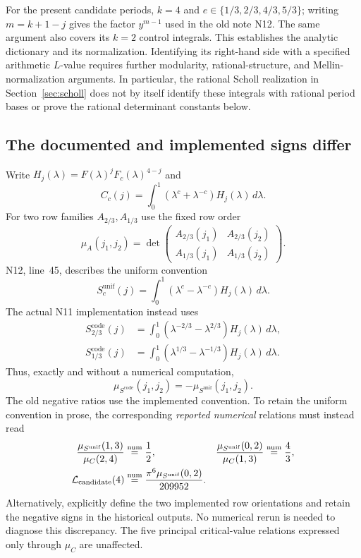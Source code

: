 For the present candidate periods, $k=4$ and
$e\in\{1/3,2/3,4/3,5/3\}$; writing $m=k+1-j$ gives the factor
$y^{m-1}$ used in the old note N12. The same argument also covers its
$k=2$ control integrals.
This establishes the analytic dictionary and its normalization. Identifying
its right-hand side with a specified arithmetic $L$-value requires further
modularity, rational-structure, and Mellin-normalization arguments. In
particular, the rational Scholl realization in Section~\ref{sec:scholl}
does not by itself identify these integrals with rational period bases or
prove the rational determinant constants below.

\subsection{The documented and implemented signs differ}
Write $H_j(\lambda)=F(\lambda)^jF_c(\lambda)^{4-j}$ and
\[
 C_c(j)=\int_0^1(\lambda^c+\lambda^{-c})H_j(\lambda)\,d\lambda.
\]
For two row families $A_{2/3},A_{1/3}$ use the fixed row order
\[
 \mu_A(j_1,j_2)=
 \det\begin{pmatrix}
 A_{2/3}(j_1)&A_{2/3}(j_2)\\
 A_{1/3}(j_1)&A_{1/3}(j_2)
 \end{pmatrix}.
\]
N12, line~45, describes the uniform convention
\[
 S_c^{\mathrm{unif}}(j)
 =\int_0^1(\lambda^c-\lambda^{-c})H_j(\lambda)\,d\lambda.
\]
The actual N11 implementation instead uses
\begin{align*}
 S_{2/3}^{\mathrm{code}}(j)
   &=\int_0^1(\lambda^{-2/3}-\lambda^{2/3})H_j(\lambda)\,d\lambda,\\
 S_{1/3}^{\mathrm{code}}(j)
   &=\int_0^1(\lambda^{1/3}-\lambda^{-1/3})H_j(\lambda)\,d\lambda.
\end{align*}
Thus, exactly and without a numerical computation,
\[
 \mu_{S^{\mathrm{code}}}(j_1,j_2)
 =-\mu_{S^{\mathrm{unif}}}(j_1,j_2).
\]
The old negative ratios use the implemented convention. To retain the
uniform convention in prose, the corresponding \emph{reported numerical}
relations must instead read
\begin{align*}
 \frac{\mu_{S^{\mathrm{unif}}}(1,3)}{\mu_C(2,4)}
     &\mathrel{\stackrel{\mathrm{num}}{=}}\frac12, &
 \frac{\mu_{S^{\mathrm{unif}}}(0,2)}{\mu_C(1,3)}
     &\mathrel{\stackrel{\mathrm{num}}{=}}\frac43,\\
 \mathcal L_{\rm candidate}(4)&\mathrel{\stackrel{\mathrm{num}}{=}}
       \frac{\pi^6\mu_{S^{\mathrm{unif}}}(0,2)}{209952}.
\end{align*}
Alternatively, explicitly define the two implemented row orientations and
retain the negative signs in the historical outputs. No numerical rerun is
needed to diagnose this discrepancy. The five principal critical-value
relations expressed only through $\mu_C$ are unaffected.

